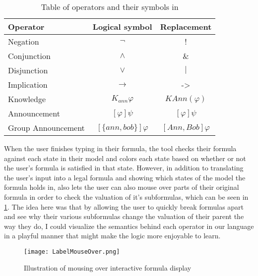 \begin{table}[H]
\centering
\caption{Table of operators and their symbols in \cname{}}
\label{tbl:symbolReplacements}
\begin{tabular}{@{}lcc@{}}
\toprule
Operator           & Logical symbol & Replacement     \\  \midrule
Negation           &       $\neg$         & !               \\
Conjunction       &      $\wedge$          & $\&$              \\
Disjunction        &    $\vee$        & $|$               \\
Implication        &       $\rightarrow$       & -\textgreater{} \\
Knowledge         &        $K_{ann}\varphi$        & $KAnn(\varphi)$            \\
Announcement   &       $[\varphi]\psi$         &  $[\varphi]\psi$     \\
Group Announcement &  $[\{ann,bob\}]\varphi$  & $[Ann,Bob]\varphi$ \\ \bottomrule
\end{tabular}%
\end{table}



When the user finishes typing in their formula, the tool checks their formula against each state in their model and colors each state based on whether or not the user's formula is satisfied in that state. However, in addition to translating the user's input into a legal formula and showing which states of the model the formula holds in, \cname{} also lets the user can also mouse over parts of their original formula in order to check the valuation of it's subformulas, which can be seen in \ref{fig:labelHover}. The idea here was that by allowing the user to quickly break formulas apart and see why their various subformulas change the valuation of their parent the way they do, I could visualize the semantics behind each operator in our language in a playful manner that might make the logic more enjoyable to learn. 

\begin{figure}[H]
	\label{fig:labelHover}
	\caption{Illustration of mousing over interactive formula display}
	\texttt{[image: LabelMouseOver.png]}
\end{figure}


